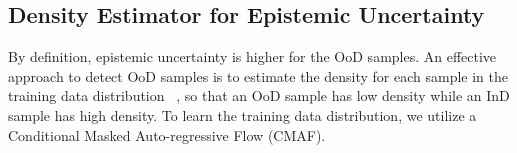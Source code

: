\documentclass{article}
\newcommand{\state}{s}
\newcommand{\action}{a}
\newcommand{\reward}{r}
\newcommand{\dataset}{\mathcal{D}}
\begin{document}




\vspace{-0.05in}
\subsection{Density Estimator for Epistemic Uncertainty}\label{subsec:epistemic-uncertainty}
By definition, epistemic uncertainty is higher for the OoD samples. An effective approach to detect OoD samples is to estimate the density for each sample in the training data distribution
~\cite{Mukhoti2021Uncertainty}, so that an OoD sample has low density while an InD sample has high density. To learn the training data distribution, we utilize a Conditional Masked Auto-regressive Flow (CMAF).
\end{document}

